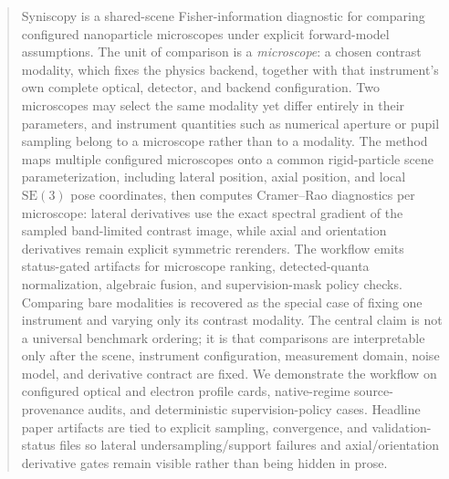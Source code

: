 \begin{abstract}
Syniscopy is a shared-scene Fisher-information diagnostic for comparing configured nanoparticle microscopes under explicit forward-model assumptions. The unit of comparison is a \emph{microscope}: a chosen contrast modality, which fixes the physics backend, together with that instrument's own complete optical, detector, and backend configuration. Two microscopes may select the same modality yet differ entirely in their parameters, and instrument quantities such as numerical aperture or pupil sampling belong to a microscope rather than to a modality. The method maps multiple configured microscopes onto a common rigid-particle scene parameterization, including lateral position, axial position, and local \(\mathrm{SE}(3)\) pose coordinates, then computes Cramer--Rao diagnostics per microscope: lateral derivatives use the exact spectral gradient of the sampled band-limited contrast image, while axial and orientation derivatives remain explicit symmetric rerenders. The workflow emits status-gated artifacts for microscope ranking, detected-quanta normalization, algebraic fusion, and supervision-mask policy checks. Comparing bare modalities is recovered as the special case of fixing one instrument and varying only its contrast modality. The central claim is not a universal benchmark ordering; it is that comparisons are interpretable only after the scene, instrument configuration, measurement domain, noise model, and derivative contract are fixed. We demonstrate the workflow on configured optical and electron profile cards, native-regime source-provenance audits, and deterministic supervision-policy cases. Headline paper artifacts are tied to explicit sampling, convergence, and validation-status files so lateral undersampling/support failures and axial/orientation derivative gates remain visible rather than being hidden in prose.
\end{abstract}
